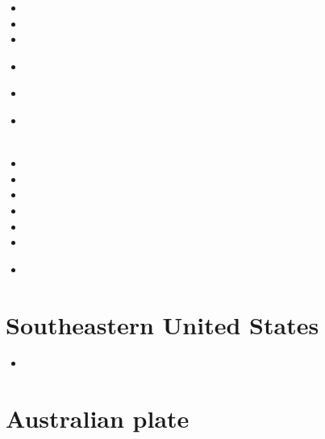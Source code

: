 \begin{scriptsize}
\begin{itemize}
\item[\nineteeneightyseven]
\item[\nineteenninetytwo]
\item[\nineteenninetyeight]
\item[\twothousand]
\\ 
\item[\twothousandfour]
\item[\twothousandsix]
 \\
 \\
\item[\twothousandnine]
\item[\twothousandtwelve]
\item[\twothousandseventeen]
\item[\twothousandeighteen]
\item[\twothousandtwenty]
\item[\twothousandtwentyone]
\item[\twothousandtwentytwo]
 \\
\end{itemize}
\end{scriptsize}

\section{Southeastern United States}

\begin{scriptsize}
\begin{itemize}
\item[\twothousandnineteen] 
\end{itemize}
\end{scriptsize}

\section{Australian plate}

